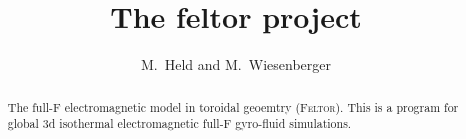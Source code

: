 





\title{The feltor project}
\author{ M.~Held and M.~Wiesenberger}
\maketitle

\begin{abstract}
The full-F electromagnetic model in toroidal geoemtry (\textsc{Feltor}).
This is a program for global 3d isothermal electromagnetic full-F gyro-fluid simulations.
\end{abstract}

